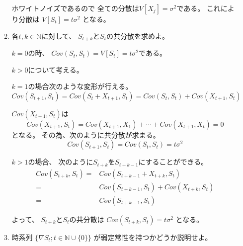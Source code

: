 \documentclass[12pt,b5paper]{ltjsarticle}
\begin{document}
\begin{enumerate}
\begin{enumerate}
            ホワイトノイズであるので
            全ての分散は$V[X_{j}]=\sigma^2$である。
            これにより分散は
            $V[S_{t}]=t\sigma^2$
            となる。

\hrulefill

       \item
            各$t,k\in\mathbb{N}$に対して、
            $S_{t+k}$と$S_{t}$の共分散を求めよ。

\dotfill

            $k=0$の時、
            $Cov(S_{t},S_{t})=V[S_{t}]=t\sigma^2$である。

            $k>0$について考える。

            $k=1$の場合次のような変形が行える。
            \begin{equation}
             Cov(S_{t+1},S_{t})
              =Cov(S_{t}+X_{t+1},S_{t})
              =Cov(S_{t},S_{t}) + Cov(X_{t+1},S_{t})
            \end{equation}

            $Cov(X_{t+1},S_{t})$は
            \begin{equation}
             Cov(X_{t+1},S_{t})
              =Cov(X_{t+1},X_{1})+\cdots +Cov(X_{t+1},X_{t})
              =0
            \end{equation}
            となる。
            その為、次のように共分散が求まる。
            \begin{equation}
             Cov(S_{t+1},S_{t})
              =Cov(S_{t},S_{t})
              =t\sigma^2
            \end{equation}

            $k>1$の場合、
            次のように$S_{t+k}$を$S_{t+k-1}$にすることができる。
            \begin{align}
             Cov(S_{t+k},S_{t})
              =& Cov(S_{t+k-1}+X_{t+k},S_{t})\\
              =& Cov(S_{t+k-1},S_{t}) + Cov(X_{t+k},S_{t})\\
              =& Cov(S_{t+k-1},S_{t})
            \end{align}


            よって、
            $S_{t+k}$と$S_{t}$の共分散は
            $Cov(S_{t+k},S_{t})=t\sigma^2$
            となる。

\hrulefill
       \item
            時系列 $\{\nabla S_{t} ; t\in\mathbb{N}\cup\{0\} \}$
            が弱定常性を持つかどうか説明せよ。

\dotfill



\end{enumerate}
\end{enumerate}
\end{document}
